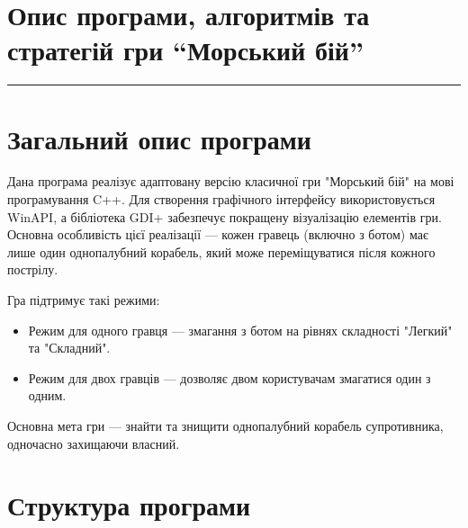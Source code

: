 \documentclass[12pt]{article}
\begin{document}
\section*{Опис програми, алгоритмів та стратегій гри ``Морський бій''}

\hrule
\section{Загальний опис програми}
Дана програма реалізує адаптовану версію класичної гри "Морський бій" на мові програмування C++. Для створення графічного інтерфейсу використовується WinAPI, а бібліотека GDI+ забезпечує покращену візуалізацію елементів гри. Основна особливість цієї реалізації — кожен гравець (включно з ботом) має лише один однопалубний корабель, який може переміщуватися після кожного пострілу.

Гра підтримує такі режими:
\begin{itemize}
    \item Режим для одного гравця — змагання з ботом на рівнях складності "Легкий" та "Складний".
    \item Режим для двох гравців — дозволяє двом користувачам змагатися один з одним.
\end{itemize}

Основна мета гри — знайти та знищити однопалубний корабель супротивника, одночасно захищаючи власний.

\section{Структура програми}
\end{document}
